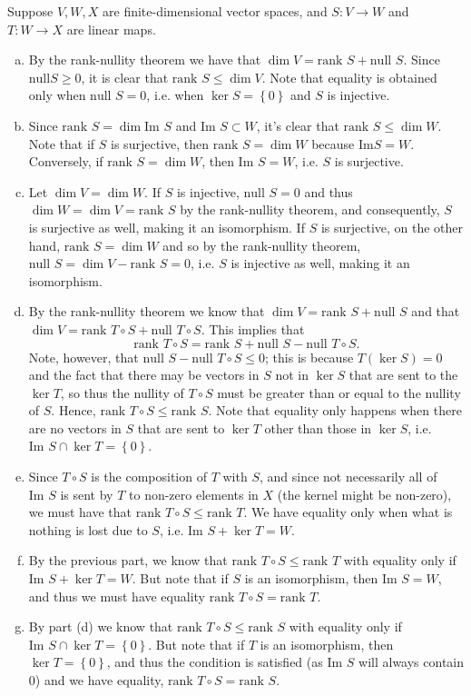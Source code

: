 \documentclass{../../mathnotes}
\begin{document}
Suppose $V,W,X$ are finite-dimensional vector spaces, and $S:V\to W$ and $T:W\to X$
are linear maps. 
\begin{enumerate}[(a)]
    \item By the rank-nullity theorem we have that $\dim V=\text{rank }S+\text{null }S$.
        Since $\text{null} S\geq 0$, it is clear that $\text{rank }S\leq \dim V$. Note that
        equality is obtained only when $\text{null }S=0$, i.e. when $\ker S=\left\{ 0 \right\}$
        and $S$ is injective.
    \item Since $\text{rank }S=\dim\text{Im }S$ and $\text{Im }S\subset W$, it's clear that
        $\text{rank }S\leq \dim W$.  Note that if $S$ is surjective, then $\text{rank }S=\dim W$
        because $\text{Im} S=W$. Conversely, if $\text{rank }S=\dim W$, then $\text{Im }S=W$,
        i.e. $S$ is surjective.
    \item Let $\dim V=\dim W$. If $S$ is injective, $\text{null }S=0$ and thus
        $\dim W=\dim V=\text{rank }S$ by the rank-nullity theorem, and consequently, $S$ is surjective
        as well, making it an isomorphism. If $S$ is surjective, on the other hand, $\text{rank }S=\dim W$
        and so by the rank-nullity theorem, $\text{null }S=\dim V-\text{rank }S=0$, i.e. $S$ is injective
        as well, making it an isomorphism.
    \item By the rank-nullity theorem we know that $\dim V=\text{rank }S+\text{null }S$ and that
        $\dim V=\text{rank }T\circ S+\text{null }T\circ S$. This implies that
        \[\text{rank }T\circ S=\text{rank }S+\text{null }S-\text{null }T\circ S.\]
        Note, however, that $\text{null }S-\text{null }T\circ S\leq 0$; this is because $T(\ker S)=0$
        and the fact that there may be vectors in $S$ not in $\ker S$ that are sent to the $\ker T$,
        so thus the nullity of $T\circ S$ must be greater than or equal to the nullity of $S$.
        Hence, $\text{rank }T\circ S\leq\text{rank } S$. Note that equality only happens when
        there are no vectors in $S$ that are sent to $\ker T$ other than those in $\ker S$, i.e.
        $\text{Im }S\cap \ker T=\left\{ 0 \right\}$.
    \item Since $T\circ S$ is the composition of $T$ with $S$, and since not necessarily all of $\text{Im }S$
        is sent by $T$ to non-zero elements in $X$ (the kernel might be non-zero), we must have that
        $\text{rank }T\circ S\leq \text{rank }T$. We have equality only when what is nothing is lost due to $S$,
        i.e. $\text{Im }S+\ker T=W$.
    \item By the previous part, we know that $\text{rank }T\circ S\leq \text{rank }T$ with equality
        only if $\text{Im }S+\ker T=W$. But note that if $S$ is an isomorphism, then $\text{Im }S=W$,
        and thus we must have equality $\text{rank }T\circ S=\text{rank }T$.
    \item By part (d) we know that $\text{rank }T\circ S\leq\text{rank }S$ with equality only if
        $\text{Im }S\cap\ker T=\left\{ 0 \right\}$. But note that if $T$ is an isomorphism, then
        $\ker T=\left\{ 0 \right\}$, and thus the condition is satisfied (as $\text{Im }S$ will always
        contain 0) and we have equality, $\text{rank }T\circ S=\text{rank }S$.
\end{enumerate}
\end{document}
